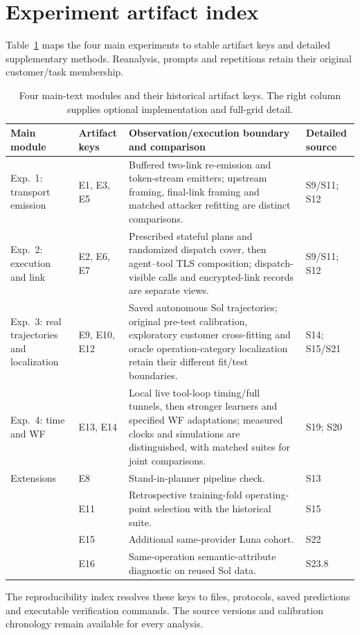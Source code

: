 \section{Experiment artifact index}\label{app:experiments}
Table~\ref{tab:r9-experiment-index} maps the four main experiments to stable artifact keys and detailed supplementary methods. Reanalysis, prompts and repetitions retain their original customer/task membership.
\begin{table}[t]\centering\footnotesize
\caption{Four main-text modules and their historical artifact keys. The right column supplies optional implementation and full-grid detail.}\label{tab:r9-experiment-index}
\begin{tabularx}{\textwidth}{@{}p{}p{}Xp{}@{}}\toprule
Main module & Artifact keys & Observation/execution boundary and comparison & Detailed source\\\midrule
Exp.\ 1: transport emission & E1, E3, E5 & Buffered two-link re-emission and token-stream emitters; upstream framing, final-link framing and matched attacker refitting are distinct comparisons. & S9/S11; S12\\
Exp.\ 2: execution and link & E2, E6, E7 & Prescribed stateful plans and randomized dispatch cover, then agent--tool TLS composition; dispatch-visible calls and encrypted-link records are separate views. & S9/S11; S12\\
Exp.\ 3: real trajectories and localization & E9, E10, E12 & Saved autonomous Sol trajectories; original pre-test calibration, exploratory customer cross-fitting and oracle operation-category localization retain their different fit/test boundaries. & S14; S15/S21\\
Exp.\ 4: time and WF & E13, E14 & Local live tool-loop timing/full tunnels, then stronger learners and specified WF adaptations; measured clocks and simulations are distinguished, with matched suites for joint comparisons. & S19; S20\\\midrule
Extensions & E8 & Stand-in-planner pipeline check. & S13\\
& E11 & Retrospective training-fold operating-point selection with the historical suite. & S15\\
& E15 & Additional same-provider Luna cohort. & S22\\
& E16 & Same-operation semantic-attribute diagnostic on reused Sol data. & S23.8\\\bottomrule
\end{tabularx}\end{table}

The reproducibility index resolves these keys to files, protocols, saved predictions and executable verification commands. The source versions and calibration chronology remain available for every analysis.
